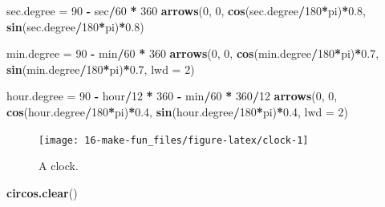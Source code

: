 \documentclass[]{book}
\newenvironment{Shaded}{\begin{snugshade}}{\end{snugshade}}
\newcommand{\KeywordTok}[1]{\textcolor[rgb]{0.13,0.29,0.53}{\textbf{#1}}}
\newcommand{\DataTypeTok}[1]{\textcolor[rgb]{0.13,0.29,0.53}{#1}}
\newcommand{\DecValTok}[1]{\textcolor[rgb]{0.00,0.00,0.81}{#1}}
\newcommand{\FloatTok}[1]{\textcolor[rgb]{0.00,0.00,0.81}{#1}}
\newcommand{\StringTok}[1]{\textcolor[rgb]{0.31,0.60,0.02}{#1}}
\newcommand{\OperatorTok}[1]{\textcolor[rgb]{0.81,0.36,0.00}{\textbf{#1}}}
\newcommand{\NormalTok}[1]{#1}
\begin{document}
\begin{Shaded}
\begin{Highlighting}[]
\NormalTok{sec.degree =}\StringTok{ }\DecValTok{90} \OperatorTok{-}\StringTok{ }\NormalTok{sec}\OperatorTok{/}\DecValTok{60} \OperatorTok{*}\StringTok{ }\DecValTok{360}
\KeywordTok{arrows}\NormalTok{(}\DecValTok{0}\NormalTok{, }\DecValTok{0}\NormalTok{, }\KeywordTok{cos}\NormalTok{(sec.degree}\OperatorTok{/}\DecValTok{180}\OperatorTok{*}\NormalTok{pi)}\OperatorTok{*}\FloatTok{0.8}\NormalTok{, }\KeywordTok{sin}\NormalTok{(sec.degree}\OperatorTok{/}\DecValTok{180}\OperatorTok{*}\NormalTok{pi)}\OperatorTok{*}\FloatTok{0.8}\NormalTok{)}

\NormalTok{min.degree =}\StringTok{ }\DecValTok{90} \OperatorTok{-}\StringTok{ }\NormalTok{min}\OperatorTok{/}\DecValTok{60} \OperatorTok{*}\StringTok{ }\DecValTok{360}
\KeywordTok{arrows}\NormalTok{(}\DecValTok{0}\NormalTok{, }\DecValTok{0}\NormalTok{, }\KeywordTok{cos}\NormalTok{(min.degree}\OperatorTok{/}\DecValTok{180}\OperatorTok{*}\NormalTok{pi)}\OperatorTok{*}\FloatTok{0.7}\NormalTok{, }\KeywordTok{sin}\NormalTok{(min.degree}\OperatorTok{/}\DecValTok{180}\OperatorTok{*}\NormalTok{pi)}\OperatorTok{*}\FloatTok{0.7}\NormalTok{, }\DataTypeTok{lwd =} \DecValTok{2}\NormalTok{)   }

\NormalTok{hour.degree =}\StringTok{ }\DecValTok{90} \OperatorTok{-}\StringTok{ }\NormalTok{hour}\OperatorTok{/}\DecValTok{12} \OperatorTok{*}\StringTok{ }\DecValTok{360} \OperatorTok{-}\StringTok{ }\NormalTok{min}\OperatorTok{/}\DecValTok{60} \OperatorTok{*}\StringTok{ }\DecValTok{360}\OperatorTok{/}\DecValTok{12}
\KeywordTok{arrows}\NormalTok{(}\DecValTok{0}\NormalTok{, }\DecValTok{0}\NormalTok{, }\KeywordTok{cos}\NormalTok{(hour.degree}\OperatorTok{/}\DecValTok{180}\OperatorTok{*}\NormalTok{pi)}\OperatorTok{*}\FloatTok{0.4}\NormalTok{, }\KeywordTok{sin}\NormalTok{(hour.degree}\OperatorTok{/}\DecValTok{180}\OperatorTok{*}\NormalTok{pi)}\OperatorTok{*}\FloatTok{0.4}\NormalTok{, }\DataTypeTok{lwd =} \DecValTok{2}\NormalTok{)}
\end{Highlighting}
\end{Shaded}

\begin{figure}

{\centering \texttt{[image: 16-make-fun\_files/figure-latex/clock-1]} 

}

\caption{A clock.}\label{fig:clock}
\end{figure}

\begin{Shaded}
\begin{Highlighting}[]
\KeywordTok{circos.clear}\NormalTok{()}
\end{Highlighting}
\end{Shaded}
\end{document}
